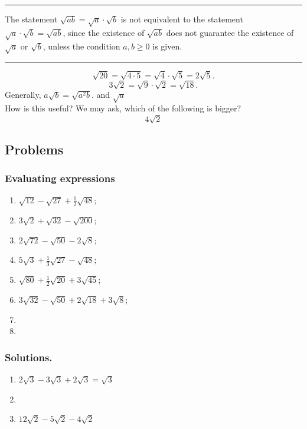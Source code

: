 \documentclass{article}
\begin{document}
\vspace{10pt}
\hrule
\vspace{10pt}

The statement $\sqrt{ab} = \sqrt{a} \cdot \sqrt{b}$ is not equivalent to the statement $\sqrt{a} \cdot \sqrt{b} = \sqrt{ab}$, since the existence of $\sqrt{ab}$ does not guarantee the existence of $\sqrt{a}$ or $\sqrt{b}$, unless the condition $a, b \ge 0$ is given.

\vspace{10pt}
\hrule
\vspace{10pt}

\[
\sqrt{20} = \sqrt{4\cdot5} = \sqrt{4} \cdot \sqrt{5} = 2\sqrt{5}.
\]
\[
3\sqrt{2} = \sqrt{9} \cdot \sqrt{2} = \sqrt{18}.
\]
Generally, $a\sqrt{b} = \sqrt{a^2b}.$ and $\sqrt{a}$\\ %

How is this useful? We may ask, which of the following is bigger?
\[
    4\sqrt{2}  %
\]

\subsection{Problems}

\subsubsection{Evaluating expressions}
\begin{enumerate} %
    \item $\sqrt{12} - \sqrt{27} + \frac{1}{2}\sqrt{48};$
    \item $3\sqrt{2} + \sqrt{32} - \sqrt{200};$
    \item $2\sqrt{72} - \sqrt{50} - 2\sqrt{8};$
    \item $5\sqrt{3} + \frac{1}{3}\sqrt{27} - \sqrt{48};$
    \item $\sqrt{80} + \frac{1}{2}\sqrt{20} + 3\sqrt{45};$
    \item $3\sqrt{32} - \sqrt{50} + 2\sqrt{18} + 3\sqrt{8};$
    \item 
    \item 
\end{enumerate} %
\subsubsection{Solutions.} %
\begin{enumerate}
    \item $2\sqrt{3} - 3\sqrt{3} + 2\sqrt{3} = \sqrt{3}$
    \item 
    \item $12\sqrt{2} - 5\sqrt{2} - 4\sqrt{2}$
\end{enumerate}
\end{document}
